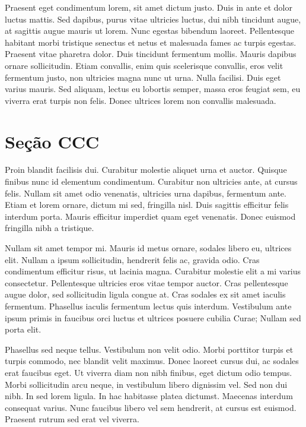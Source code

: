 \documentclass{article}
\begin{document}
	
	Praesent eget condimentum lorem, sit amet dictum justo. Duis in ante et dolor luctus mattis. Sed dapibus, purus vitae ultricies luctus, dui nibh tincidunt augue, at sagittis augue mauris ut lorem. Nunc egestas bibendum laoreet. Pellentesque habitant morbi tristique senectus et netus et malesuada fames ac turpis egestas. Praesent vitae pharetra dolor. Duis tincidunt fermentum mollis. Mauris dapibus ornare sollicitudin. Etiam convallis, enim quis scelerisque convallis, eros velit fermentum justo, non ultricies magna nunc ut urna. Nulla facilisi. Duis eget varius mauris. Sed aliquam, lectus eu lobortis semper, massa eros feugiat sem, eu viverra erat turpis non felis. Donec ultrices lorem non convallis malesuada.
	
	
	\section{Seção CCC}
	
	Proin blandit facilisis dui. Curabitur molestie aliquet urna et auctor. Quisque finibus nunc id elementum condimentum. Curabitur non ultricies ante, at cursus felis. Nullam sit amet odio venenatis, ultricies urna dapibus, fermentum ante. Etiam et lorem ornare, dictum mi sed, fringilla nisl. Duis sagittis efficitur felis interdum porta. Mauris efficitur imperdiet quam eget venenatis. Donec euismod fringilla nibh a tristique.
	
	Nullam sit amet tempor mi. Mauris id metus ornare, sodales libero eu, ultrices elit. Nullam a ipsum sollicitudin, hendrerit felis ac, gravida odio. Cras condimentum efficitur risus, ut lacinia magna. Curabitur molestie elit a mi varius consectetur. Pellentesque ultricies eros vitae tempor auctor. Cras pellentesque augue dolor, sed sollicitudin ligula congue at. Cras sodales ex sit amet iaculis fermentum. Phasellus iaculis fermentum lectus quis interdum. Vestibulum ante ipsum primis in faucibus orci luctus et ultrices posuere cubilia Curae; Nullam sed porta elit.
	
	Phasellus sed neque tellus. Vestibulum non velit odio. Morbi porttitor turpis et turpis commodo, nec blandit velit maximus. Donec laoreet cursus dui, ac sodales erat faucibus eget. Ut viverra diam non nibh finibus, eget dictum odio tempus. Morbi sollicitudin arcu neque, in vestibulum libero dignissim vel. Sed non dui nibh. In sed lorem ligula. In hac habitasse platea dictumst. Maecenas interdum consequat varius. Nunc faucibus libero vel sem hendrerit, at cursus est euismod. Praesent rutrum sed erat vel viverra. 
\end{document}
